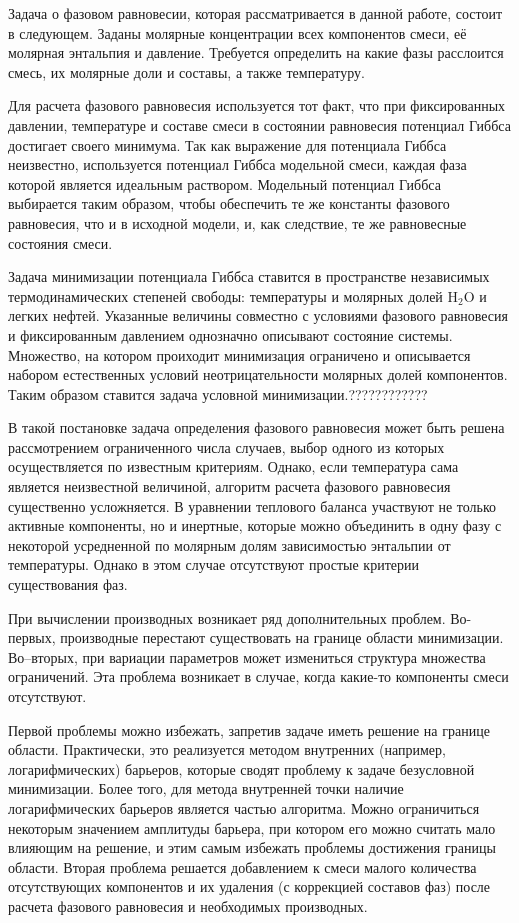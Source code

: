 \documentclass[12pt]{article}
\begin{document}
Задача о фазовом равновесии, которая рассматривается в данной работе, состоит в следующем. Заданы молярные концентрации всех компонентов смеси, её молярная энтальпия и давление. Требуется определить на какие фазы расслоится смесь, их молярные доли и составы, а также температуру.

Для расчета фазового равновесия используется тот факт, что при фиксированных давлении, температуре и составе смеси в состоянии равновесия потенциал Гиббса достигает своего минимума. Так как выражение для потенциала Гиббса неизвестно, используется потенциал Гиббса модельной смеси, каждая фаза которой является идеальным раствором. Модельный потенциал Гиббса выбирается таким образом, чтобы обеспечить те же константы фазового равновесия, что и в исходной модели, и, как следствие, те же равновесные состояния смеси.

Задача минимизации потенциала Гиббса ставится в пространстве независимых термодинамических степеней свободы: температуры и молярных долей $\mathrm{H_2O}$ и легких нефтей. Указанные величины совместно с условиями фазового равновесия и фиксированным давлением однозначно описывают состояние системы. Множество, на котором проиходит минимизация ограничено и описывается набором естественных условий неотрицательности молярных долей компонентов. Таким образом ставится задача условной минимизации.????????????

В такой постановке задача определения фазового равновесия может быть решена рассмотрением ограниченного числа случаев, выбор одного из которых осуществляется по известным критериям. Однако, если температура сама является неизвестной величиной, алгоритм расчета фазового равновесия существенно усложняется. В уравнении теплового баланса участвуют не только активные компоненты, но и инертные, которые можно объединить в одну фазу с некоторой усредненной по молярным долям зависимостью энтальпии от температуры. Однако в этом случае отсутствуют простые критерии существования фаз.

При вычислении производных возникает ряд дополнительных проблем. Во-первых, производные перестают существовать на границе области минимизации. Во--вторых, при вариации параметров может измениться структура множества ограничений. Эта проблема возникает в случае, когда какие-то компоненты смеси отсутствуют.

Первой проблемы можно избежать, запретив задаче иметь решение на границе области. Практически, это реализуется методом внутренних (например, логарифмических) барьеров, которые сводят проблему к задаче безусловной минимизации. Более того, для метода внутренней точки наличие логарифмических барьеров является частью алгоритма. Можно ограничиться некоторым значением амплитуды барьера, при котором его можно считать мало влияющим на решение, и этим самым избежать проблемы достижения границы области. Вторая проблема решается добавлением к смеси малого количества отсутствующих компонентов и их удаления (с коррекцией составов фаз) после расчета фазового равновесия и необходимых производных.
\end{document}
